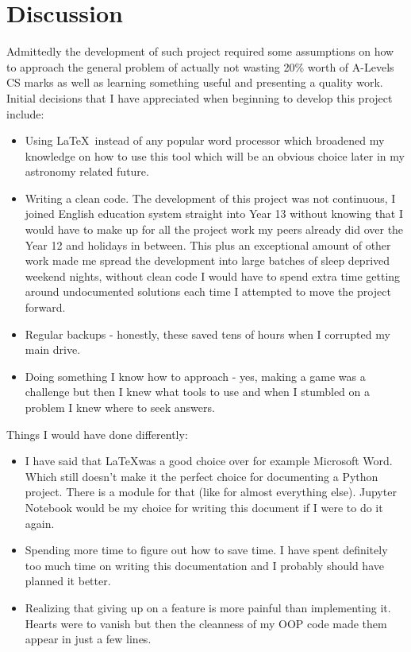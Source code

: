 \documentclass[11pt,a4paper,notitlepage]{report}
\begin{document}
		\section{Discussion}
			Admittedly the development of such project required some assumptions on how to approach the general problem of actually not wasting 20\% worth of A-Levels CS marks as well as learning something useful and presenting a quality work. Initial decisions that I have appreciated when beginning to develop this project include:
			\begin{itemize}
				\item
				Using \LaTeX\ instead of any popular word processor which broadened my knowledge on how to use this tool which will be an obvious choice later in my astronomy related future.
				\item
				Writing a clean code. The development of this project was not continuous, I joined English education system straight into Year 13 without knowing that I would have to make up for all the project work my peers already did over the Year 12 and holidays in between. This plus an exceptional amount of other work made me spread the development into large batches of sleep deprived weekend nights, without clean code I would have to spend extra time getting around undocumented solutions each time I attempted to move the project forward.
				\item
				Regular backups - honestly, these saved tens of hours when I corrupted my main drive.
				\item
				Doing something I know how to approach - yes, making a game was a challenge but then I knew what tools to use and when I stumbled on a problem I knew where to seek answers.
			\end{itemize}
		Things I would have done differently:
			\begin{itemize}
				\item
				I have said that \LaTeX was a good choice over for example Microsoft Word. Which still doesn't make it the perfect choice for documenting a Python project. There is a module for that (like for almost everything else). Jupyter Notebook would be my choice for writing this document if I were to do it again.
				\item
				Spending more time to figure out how to save time. I have spent definitely too much time on writing this documentation and I probably should have planned it better.
				\item
				Realizing that giving up on a feature is more painful than implementing it. Hearts were to vanish but then the cleanness of my OOP code made them appear in just a few lines.  
			\end{itemize}
\end{document}
